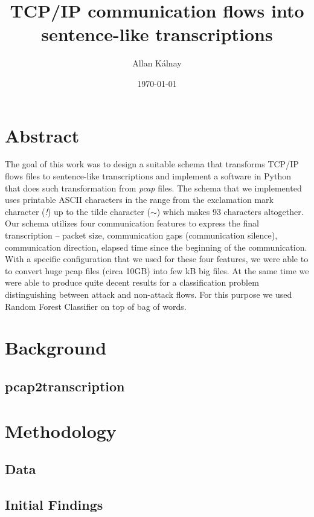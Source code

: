\documentclass{article}
\title{TCP/IP communication flows into sentence-like transcriptions}
\author{Allan Kálnay}
\date{\today}
\begin{document}
\maketitle

\section*{Abstract}
The goal of this work was to design a suitable schema that transforms TCP/IP flows files to sentence-like transcriptions and implement a software in Python that does such transformation from \textit{pcap} files. The schema that we implemented uses printable ASCII characters in the range from the exclamation mark character (\textit{!}) up to the tilde character (\textit{$\sim$}) which makes 93 characters altogether. Our schema utilizes four communication features to express the final transcription -- packet size, communication gaps (communication silence), communication direction, elapsed time since the beginning of the communication. With a specific configuration that we used for these four features, we were able to to convert huge pcap files (circa 10GB) into few kB big files. At the same time we were able to produce quite decent results for a classification problem distinguishing between attack and non-attack flows. For this purpose we used Random Forest Classifier on top of bag of words.

\newpage
\tableofcontents
\newpage

\section{Background}
\subsection{pcap2transcription}

\section{Methodology}
\subsection{Data}

\subsection{Initial Findings}
\end{document}
